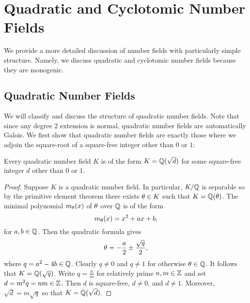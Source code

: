 \chapter{Quadratic and Cyclotomic Number Fields}
  We provide a more detailed discussion of number fields with particularly simple structure. Namely, we discuss quadratic and cyclotomic number fields because they are monogenic.
  \section{Quadratic Number Fields}
    We will classify and discuss the structure of quadratic number fields. Note that since any degree $2$ extension is normal, quadratic number fields are automatically Galois. We first show that quadratic number fields are exactly those where we adjoin the square-root of a square-free integer other than $0$ or $1$:

    \begin{proposition}\label{prop:classification_of_quadratic_number_fields}
      Every quadratic number field $K$ is of the form $K = \mathbb{Q}(\sqrt{d})$ for some square-free integer $d$ other than $0$ or $1$.
    \end{proposition}
    \begin{proof}
      Suppose $K$ is a quadratic number field. In particular, $K/\mathbb{Q}$ is separable so by the primitive element theorem there exists $\theta \in K$ such that $K = \mathbb{Q}(\theta)$. The minimal polynomial $m_{\theta}(x)$ of $\theta$ over $\mathbb{Q}$ is of the form
      \[
        m_{\theta}(x) = x^{2}+ax+b,
      \]
      for $a,b \in \mathbb{Q}$. Then the quadratic formula gives
      \[
        \theta = -\frac{a}{2}\pm\frac{\sqrt{q}}{2},
      \]
      where $q = a^{2}-4b \in \mathbb{Q}$. Clearly $q \neq 0$ and $q \neq 1$ for otherwise $\theta \in \mathbb{Q}$. It follows that $K = \mathbb{Q}(\sqrt{q})$. Write $q = \frac{n}{m}$ for relatively prime $n,m \in \mathbb{Z}$ and set $d = m^{2}q = nm \in \mathbb{Z}$. Then $d$ is square-free, $d \neq 0$, and $d \neq 1$. Moreover, $\sqrt{d} = m\sqrt{q}$ so that $K = \mathbb{Q}(\sqrt{d})$. 
    \end{proof}

